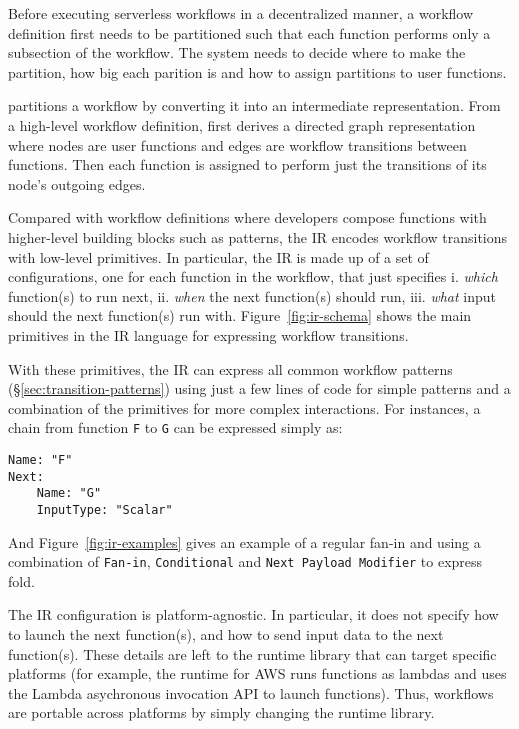 Before executing serverless workflows in a decentralized manner, a workflow
definition first needs to be partitioned such that each function performs only
a subsection of the workflow. The system needs to decide where to make the
partition, how big each parition is and how to assign partitions to user
functions. 

\name{} partitions a workflow by converting it into an intermediate
representation. From a high-level workflow definition, \name{} first derives a
directed graph representation where nodes are user functions and edges are
workflow transitions between functions. Then each function is assigned to
perform just the transitions of its node's outgoing edges. 

Compared with workflow definitions where developers compose functions with
higher-level building blocks such as patterns, the \name{} IR encodes workflow
transitions with low-level primitives. In particular, the IR is made up of a
set of configurations, one for each function in the workflow, that just
specifies i. \textit{which} function(s) to run next, ii. \textit{when} the
next function(s) should run, iii. \textit{what} input should the next
function(s) run with. Figure~\ref{fig:ir-schema} shows the main primitives in
the \name{} IR language for expressing workflow transitions.

With these primitives, the IR can express all common workflow patterns
(\S\ref{sec:transition-patterns}) using just a few lines of code for simple
patterns and a combination of the primitives for more complex interactions.
For instances, a chain from function \texttt{F} to \texttt{G} can be expressed
simply as:
\begin{verbatim}
Name: "F"
Next:
    Name: "G"
    InputType: "Scalar"
\end{verbatim}

And Figure~\ref{fig:ir-examples} gives an example of a regular fan-in and
using a combination of \texttt{Fan-in}, \texttt{Conditional} and \texttt{Next
Payload Modifier} to express fold.

The IR configuration is platform-agnostic. In particular, it does not specify
how to launch the next function(s), and how to send input data to the next
function(s). These details are left to the \name{} runtime library that can
target specific platforms (for example, the runtime for AWS runs functions as
lambdas and uses the Lambda asychronous invocation API to launch functions).
Thus, workflows are portable across platforms by simply changing the runtime
library.

